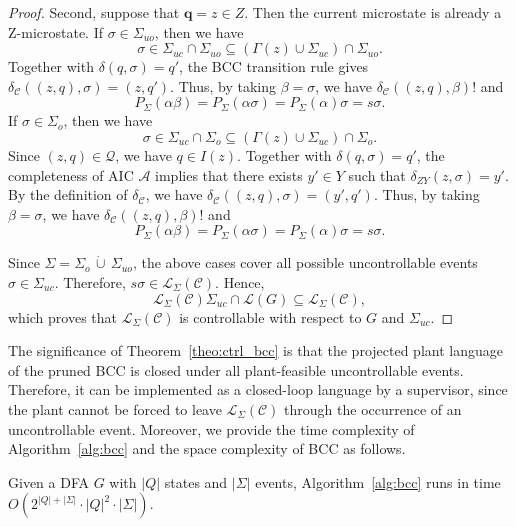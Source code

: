 \documentclass[journal,twoside,web]{ieeecolor}
\begin{document}
\begin{proof}
Second, suppose that $\bm{q} = z\in Z$. Then the current microstate is already
a Z-microstate.
%
If $\sigma \in \Sigma_{uo}$, then we have
$$
    \sigma\in\Sigma_{uc}\cap\Sigma_{uo} \subseteq
    (\Gamma(z)\cup\Sigma_{uc})\cap\Sigma_{uo}.
$$
Together with $\delta(q,\sigma) = q'$, the BCC transition rule gives
$
    \delta_{\mathcal{C}}((z,q),\sigma) = (z,q').
$
Thus, by taking $\beta = \sigma$, we have
$
    \delta_{\mathcal{C}}((z,q),\beta)!
$
and
$$
    P_\Sigma(\alpha\beta) = P_\Sigma(\alpha\sigma) = P_\Sigma(\alpha)\sigma = s\sigma.
$$
%
If $\sigma\in\Sigma_o$, then we have 
$$
    \sigma\in\Sigma_{uc}\cap\Sigma_o \subseteq (\Gamma(z)\cup\Sigma_{uc})\cap\Sigma_o.
$$
Since $(z,q)\in\bm{\mathcal{Q}}$, we have $q\in I(z)$. Together with
$\delta(q,\sigma) = q'$, the completeness of AIC $\mathcal{A}$ implies that
there exists $y'\in Y$ such that
$
    \delta_{ZY}(z,\sigma) = y'.
$
By the definition of $\delta_{\mathcal{C}}$, we have
$
    \delta_{\mathcal{C}}((z,q),\sigma) = (y',q').
$
Thus, by taking $\beta = \sigma$, we have
$
    \delta_{\mathcal{C}}((z,q),\beta)!
$
and
$$
    P_\Sigma(\alpha\beta) = P_\Sigma(\alpha\sigma) = P_\Sigma(\alpha)\sigma = s\sigma.
$$

Since $\Sigma = \Sigma_o \, \dot{\cup} \, \Sigma_{uo}$, the above cases cover all
possible uncontrollable events $\sigma\in\Sigma_{uc}$. Therefore,
$s\sigma\in\mathcal{L}_{\Sigma}(\mathcal{C})$. Hence,
$$
    \mathcal{L}_{\Sigma}(\mathcal{C})\Sigma_{uc} \cap \mathcal{L}(G) \subseteq \mathcal{L}_{\Sigma}(\mathcal{C}),
$$
which proves that $\mathcal{L}_{\Sigma}(\mathcal{C})$ is controllable with
respect to $G$ and $\Sigma_{uc}$.
\end{proof}

The significance of Theorem~\ref{theo:ctrl_bcc} is that the projected plant language of the pruned BCC is closed under all plant-feasible uncontrollable events. 
Therefore, it can be implemented as a closed-loop language by a supervisor, since the plant cannot be forced to leave $\mathcal{L}_{\Sigma}(\mathcal{C})$ through the occurrence of an uncontrollable event.
%
Moreover, we provide the time complexity of Algorithm~\ref{alg:bcc} and the space complexity of BCC as follows.

\begin{proposition}
Given a DFA $G$ with $|Q|$ states and $|\Sigma|$ events, Algorithm~\ref{alg:bcc} runs in time
$
    O(2^{|Q|+|\Sigma|}\cdot |Q|^2\cdot |\Sigma|).
$
\end{proposition}
\end{document}
